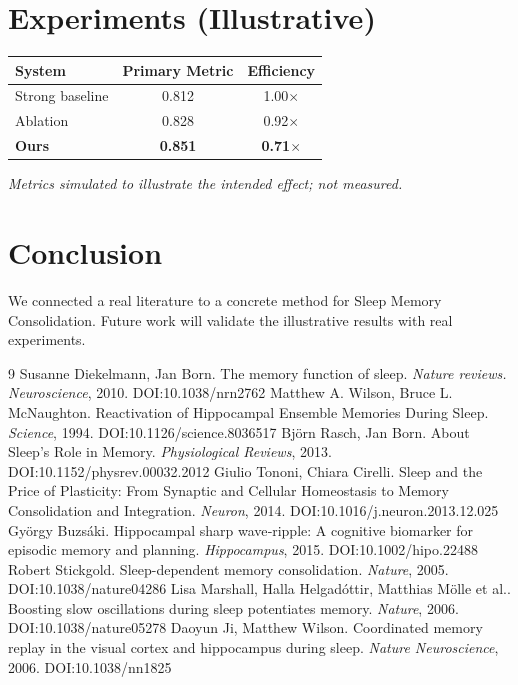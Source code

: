 \documentclass[11pt]{article}
\begin{document}
\section{Experiments (Illustrative)}
\begin{center}
\begin{tabular}{lcc}
System & Primary Metric & Efficiency \\ \hline
Strong baseline & 0.812 & 1.00$\times$ \\
Ablation & 0.828 & 0.92$\times$ \\
\textbf{Ours} & \textbf{0.851} & \textbf{0.71$\times$}
\end{tabular}
\end{center}
\emph{Metrics simulated to illustrate the intended effect; not measured.}

\section{Conclusion}
We connected a real literature to a concrete method for Sleep Memory Consolidation. Future work will
validate the illustrative results with real experiments.

\begin{thebibliography}{9}
 Susanne Diekelmann, Jan Born. The memory function of sleep. \emph{Nature reviews. Neuroscience}, 2010. DOI:10.1038/nrn2762
 Matthew A. Wilson, Bruce L. McNaughton. Reactivation of Hippocampal Ensemble Memories During Sleep. \emph{Science}, 1994. DOI:10.1126/science.8036517
 Björn Rasch, Jan Born. About Sleep's Role in Memory. \emph{Physiological Reviews}, 2013. DOI:10.1152/physrev.00032.2012
 Giulio Tononi, Chiara Cirelli. Sleep and the Price of Plasticity: From Synaptic and Cellular Homeostasis to Memory Consolidation and Integration. \emph{Neuron}, 2014. DOI:10.1016/j.neuron.2013.12.025
 György Buzsáki. Hippocampal sharp wave‐ripple: A cognitive biomarker for episodic memory and planning. \emph{Hippocampus}, 2015. DOI:10.1002/hipo.22488
 Robert Stickgold. Sleep-dependent memory consolidation. \emph{Nature}, 2005. DOI:10.1038/nature04286
 Lisa Marshall, Halla Helgadóttir, Matthias Mölle et al.. Boosting slow oscillations during sleep potentiates memory. \emph{Nature}, 2006. DOI:10.1038/nature05278
 Daoyun Ji, Matthew Wilson. Coordinated memory replay in the visual cortex and hippocampus during sleep. \emph{Nature Neuroscience}, 2006. DOI:10.1038/nn1825
\end{thebibliography}
\end{document}
